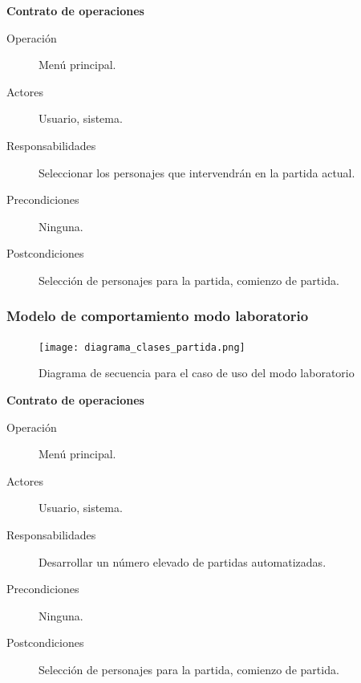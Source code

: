 \textbf{Contrato de operaciones}
\begin{description}
    \item[Operación] Menú principal.
    \item[Actores] Usuario, sistema.
    \item[Responsabilidades] Seleccionar los personajes que intervendrán en la partida actual.
    \item[Precondiciones] Ninguna.
    \item[Postcondiciones] Selección de personajes para la partida, comienzo de partida.
\end{description}

\subsubsection{Modelo de comportamiento modo laboratorio}

\begin{figure}[h]
  \begin{center}
    \texttt{[image: diagrama\_clases\_partida.png]}
  \end{center}
  \caption{Diagrama de secuencia para el caso de uso del modo laboratorio}
  \label{diagrama_clases_laboratorio}
\end{figure}

\textbf{Contrato de operaciones}
\begin{description}
    \item[Operación] Menú principal.
    \item[Actores] Usuario, sistema.
    \item[Responsabilidades] Desarrollar un número elevado de partidas automatizadas.
    \item[Precondiciones] Ninguna.
    \item[Postcondiciones] Selección de personajes para la partida, comienzo de partida.
\end{description}

